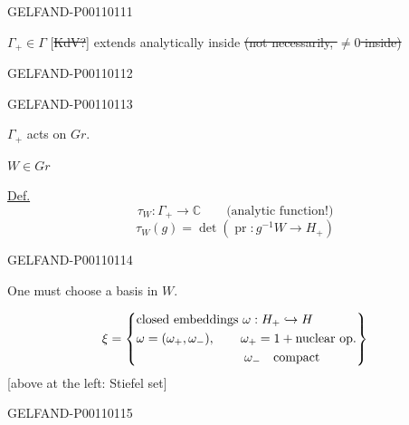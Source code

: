 \begin{GelfandAdjacentEvidence}{GELFAND-P001101}{11}


$\Gamma_+\in\Gamma$ [\sout{KdV?}] extends analytically inside
\sout{(not necessarily, $\ne0$ inside)}
\end{GelfandAdjacentEvidence}
\begin{GelfandAdjacentEvidence}{GELFAND-P001101}{12}

\end{GelfandAdjacentEvidence}
\begin{GelfandAdjacentEvidence}{GELFAND-P001101}{13}


$\Gamma_+$ acts on $Gr$.

$W\in Gr$

\underline{Def.}
\[
\tau_W:\Gamma_+\longrightarrow\mathbb C\qquad\text{(analytic function!)}
\]
\[
\tau_W(g)=\det(\operatorname{pr}:g^{-1}W\longrightarrow H_+)
\]
\end{GelfandAdjacentEvidence}
\begin{GelfandAdjacentEvidence}{GELFAND-P001101}{14}


One must choose a basis in $W$.

\[
\xi=\left\{\begin{aligned}
&\text{closed embeddings }\omega:H_+\hookrightarrow H\\
&\omega=(\omega_+,\omega_-),\qquad
  \omega_+=1+\text{nuclear op.}\\
&\hspace{30mm}\omega_-\quad\text{compact}
\end{aligned}\right\}
\]
[above at the left: Stiefel set]
\end{GelfandAdjacentEvidence}
\begin{GelfandAdjacentEvidence}{GELFAND-P001101}{15}

\end{GelfandAdjacentEvidence}



